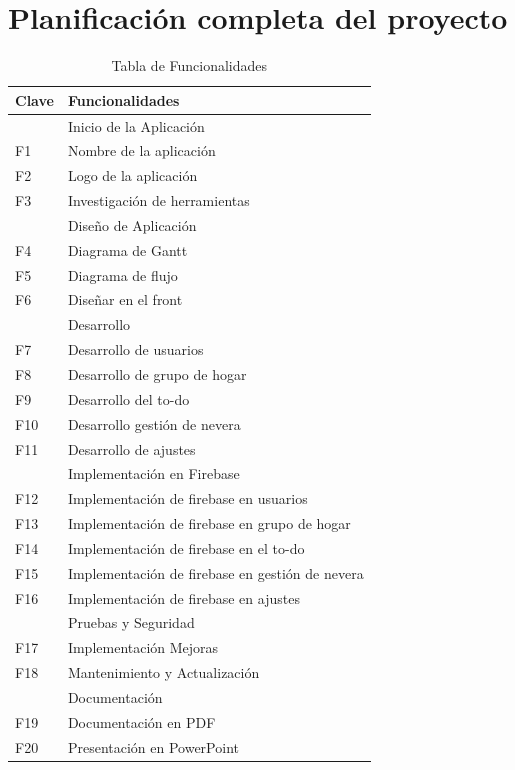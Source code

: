 \documentclass{article}
\begin{document}
    \section{Planificación completa del proyecto}
    \begin{table}[H]
    \centering
    \begin{tabular}{|l|l|}
        \hline
        \textbf{Clave} & \textbf{Funcionalidades} \\ \hline
         & Inicio de la Aplicación \\ \hline
        F1 & Nombre de la aplicación \\ \hline
        F2 & Logo de la aplicación \\ \hline
        F3 & Investigación de herramientas \\ \hline
         & Diseño de Aplicación \\ \hline
        F4 & Diagrama de Gantt \\ \hline
        F5 & Diagrama de flujo \\ \hline
        F6 & Diseñar en el front \\ \hline
         & Desarrollo \\ \hline
        F7 & Desarrollo de usuarios \\ \hline
        F8 & Desarrollo de grupo de hogar \\ \hline
        F9 & Desarrollo del to-do \\ \hline
        F10 & Desarrollo gestión de nevera \\ \hline
        F11 & Desarrollo de ajustes \\ \hline
         & Implementación en Firebase \\ \hline
        F12 & Implementación de firebase en usuarios \\ \hline
        F13 & Implementación de firebase en grupo de hogar \\ \hline
        F14 & Implementación de firebase en  el to-do \\ \hline
        F15 & Implementación de firebase en  gestión de nevera \\ \hline
        F16 & Implementación de firebase en  ajustes \\ \hline
         & Pruebas y Seguridad \\ \hline
        F17 & Implementación Mejoras  \\ \hline
        F18 & Mantenimiento y Actualización \\ \hline
         & Documentación \\ \hline
        F19 & Documentación en PDF \\ \hline
        F20 & Presentación en PowerPoint \\ \hline
    \end{tabular}
    \caption{Tabla de Funcionalidades}
    \label{tab:funcionalidades}
\end{table}
\end{document}
